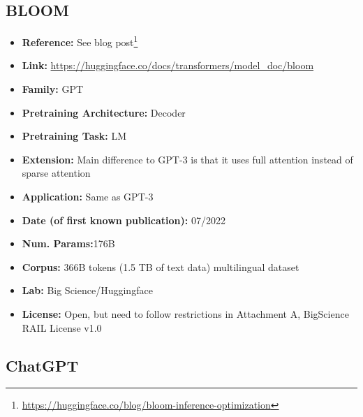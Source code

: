 \documentclass{article}
\begin{document}
\subsection{BLOOM}
            \begin{itemize}
                \item \textbf{Reference:} See blog post\footnote{\url{https://huggingface.co/blog/bloom-inference-optimization}}
                \item \textbf{Link:} \url{https://huggingface.co/docs/transformers/model_doc/bloom}
                \item \textbf{Family:} GPT 
                \item \textbf{Pretraining Architecture:} Decoder
                \item \textbf{Pretraining Task:} LM
                \item \textbf{Extension:} Main difference to GPT-3 is that it uses full attention instead of sparse attention  
                \item \textbf{Application:} Same as GPT-3
                \item \textbf{Date (of first known publication):} 07/2022
                \item \textbf{Num. Params:}176B
                \item \textbf{Corpus:} 366B tokens (1.5 TB of text data) multilingual dataset
                \item \textbf{Lab:} Big Science/Huggingface
                \item \textbf{License:} Open, but need to follow restrictions in Attachment A, BigScience RAIL License v1.0
            \end{itemize}
            
\subsection{ChatGPT}
\end{document}
